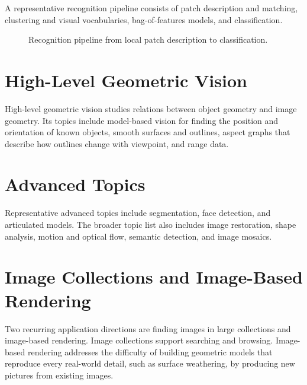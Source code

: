 \documentclass[11pt,a4paper,oneside]{report}
\begin{document}
A representative recognition pipeline consists of patch description and matching, clustering and visual vocabularies, bag-of-features models, and classification.

\begin{figure}[!htbp]
\centering
{}
\caption{Recognition pipeline from local patch description to classification.}
\label{fig:recognition-pipeline}
\end{figure}

\section{High-Level Geometric Vision}

High-level geometric vision studies relations between object geometry and image geometry. Its topics include model-based vision for finding the position and orientation of known objects, smooth surfaces and outlines, aspect graphs that describe how outlines change with viewpoint, and range data.

\section{Advanced Topics}

Representative advanced topics include segmentation, face detection, and articulated models. The broader topic list also includes image restoration, shape analysis, motion and optical flow, semantic detection, and image mosaics.

\section{Image Collections and Image-Based Rendering}

Two recurring application directions are finding images in large collections and image-based rendering. Image collections support searching and browsing. Image-based rendering addresses the difficulty of building geometric models that reproduce every real-world detail, such as surface weathering, by producing new pictures from existing images.
\end{document}
